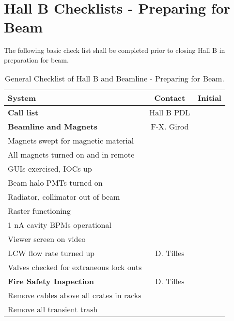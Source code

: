 \begin{table}[p]
\section{Hall B Checklists - Preparing for Beam}
The following basic check list shall be completed prior to closing Hall B in 
preparation for beam.
\caption{\label{table:beam} General Checklist of Hall B and Beamline - 
Preparing for Beam.} 
\begin{center}
\begin{tabular}{|l|c|c|} \hline
System & \hspace{1.5cm}Contact\hspace{1.5cm}  &  Initial \\ \hline
\bf{Call list}                                  & Hall B PDL & \\ \hline
\bf{Beamline and Magnets}                       & F-X. Girod & \\ \hline
Magnets swept for magnetic material             & & \\ \hline
All magnets turned on and in remote             & & \\ \hline
GUIs exercised, IOCs up                         & & \\ \hline
Beam halo PMTs turned on                        & & \\ \hline
Radiator, collimator out of beam                & & \\ \hline
Raster functioning                              & & \\ \hline
1 nA cavity BPMs operational                    & & \\ \hline
Viewer screen on video                          & & \\ \hline
LCW flow rate turned up                         & D. Tilles & \\ \hline
Valves checked for extraneous lock outs         & & \\ \hline
\bf{Fire Safety Inspection}                     & D. Tilles & \\ \hline 
Remove cables above all crates in racks         & & \\ \hline 
Remove all transient trash                      & & \\ \hline 

\end{tabular}
\end{center}
\end{table}
